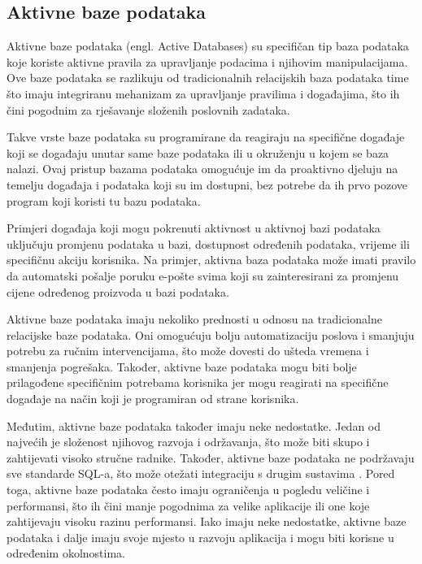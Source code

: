 \documentclass[]{foi} %
\begin{document}
\subsection{Aktivne baze podataka}

Aktivne baze podataka (engl. Active Databases) \cite{tbp} su specifičan tip baza podataka koje koriste aktivne pravila za upravljanje podacima i njihovim manipulacijama. Ove baze podataka se razlikuju od tradicionalnih relacijskih baza podataka time što imaju integriranu mehanizam za upravljanje pravilima i događajima, što ih čini pogodnim za rješavanje složenih poslovnih zadataka.

Takve vrste baze podataka su programirane da reagiraju na specifične događaje koji se događaju unutar same baze podataka ili u okruženju u kojem se baza nalazi. Ovaj pristup bazama podataka omogućuje im da proaktivno djeluju na temelju događaja i podataka koji su im dostupni, bez potrebe da ih prvo pozove program koji koristi tu bazu podataka. \cite{tbp}

Primjeri događaja koji mogu pokrenuti aktivnost u aktivnoj bazi podataka uključuju promjenu podataka u bazi, dostupnost određenih podataka, vrijeme ili specifičnu akciju korisnika. Na primjer, aktivna baza podataka može imati pravilo da automatski pošalje poruku e-pošte svima koji su zainteresirani za promjenu cijene određenog proizvoda u bazi podataka.

Aktivne baze podataka imaju nekoliko prednosti u odnosu na tradicionalne relacijske baze podataka. Oni omogućuju bolju automatizaciju poslova i smanjuju potrebu za ručnim intervencijama, što može dovesti do ušteda vremena i smanjenja pogrešaka. Također, aktivne baze podataka mogu biti bolje prilagođene specifičnim potrebama korisnika jer mogu reagirati na specifične događaje na način koji je programiran od strane korisnika. \cite{tbp}

Međutim, aktivne baze podataka također imaju neke nedostatke. Jedan od najvećih je složenost njihovog razvoja i održavanja, što može biti skupo i zahtijevati visoko stručne radnike. Također, aktivne baze podataka ne podržavaju sve standarde SQL-a, što može otežati integraciju s drugim sustavima \cite{tbp}. Pored toga, aktivne baze podataka često imaju ograničenja u pogledu veličine i performansi, što ih čini manje pogodnima za velike aplikacije ili one koje zahtijevaju visoku razinu performansi. Iako imaju neke nedostatke, aktivne baze podataka i dalje imaju svoje mjesto u razvoju aplikacija i mogu biti korisne u određenim okolnostima.
\newpage
\end{document}
